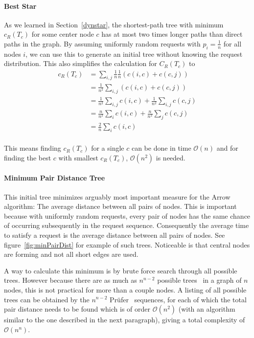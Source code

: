 \documentclass[a4paper, oneside]{discothesis}
\begin{document}
\paragraph{Best Star}

As we learned in Section~\ref{dynstar}, the shortest-path tree with minimum $c_R(T_c)$ for some center node $c$ has at most two times longer paths than direct paths in the graph. By assuming uniformly random requests with $p_i=\frac{1}{n}$ for all nodes $i$, we can use this to generate an initial tree without knowing the request distribution. This also simplifies the calculation for $C_R(T_c)$ to
\begin{equation}
\begin{split}
c_R(T_c)&=\sum_{i,j}\frac{1}{n}\frac{1}{n}(c(i,c)+c(c,j)) \\
&=\frac{1}{n^2}\sum_{i,j}(c(i,c)+c(c,j)) \\
&=\frac{1}{n^2}\sum_{i,j}c(i,c)+\frac{1}{n^2}\sum_{i,j}c(c,j) \\
&=\frac{n}{n^2}\sum_{i}c(i,c)+\frac{n}{n^2}\sum_{j}c(c,j) \\
&=\frac{2}{n}\sum_{i}c(i,c) \\
\end{split}
\end{equation}

This means finding $c_R(T_c)$ for a single $c$ can be done in time $\mathcal{O}(n)$ and for finding the best $c$ with smallest $c_R(T_c)$, $\mathcal{O}(n^2)$ is needed.

\paragraph{Minimum Pair Distance Tree}
\label{tree:mpd}

This initial tree minimizes arguably most important measure for the Arrow algorithm: The average distance between all pairs of nodes. This is important because with uniformly random requests, every pair of nodes has the same chance of occurring subsequently in the request sequence. Consequently the average time to satisfy a request is the average distance between all pairs of nodes. See figure~\ref{fig:minPairDist} for example of such trees. Noticeable is that central nodes are forming and not all short edges are used.

A way to calculate this minimum is by brute force search through all possible trees. However because there are as much as $n^{n-2}$ possible trees~\cite{Borchardt} in a graph of $n$ nodes, this is not practical for more than a couple nodes. A listing of all possible trees can be obtained by the $n^{n-2}$ Prüfer~\cite{Prufer} sequences, for each of which the total pair distance needs to be found which is of order $\mathcal{O}(n^2)$ (with an algorithm similar to the one described in the next paragraph), giving a total complexity of $\mathcal{O}(n^n)$.
\end{document}
